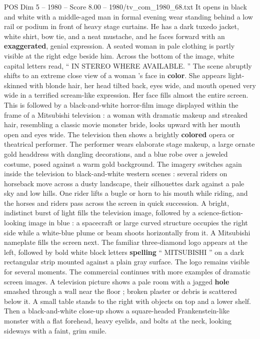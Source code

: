 \begin{textsample}{POS Dim 5 – 1980 – Score 8.00 – 1980/tv\_com\_1980\_68.txt}  \label{ex:f5_pos_032}
It opens in black and white with a middle-aged man in formal evening wear standing behind a low rail or podium in front of heavy stage curtains.
He has a dark tuxedo jacket, white shirt, bow tie, and a neat mustache, and he faces forward with an \textbf{exaggerated}, genial expression.
A seated woman in pale clothing is partly visible at the right edge beside him.
Across the bottom of the image, white capital letters read, “ IN STEREO WHERE AVAILABLE. ” The scene abruptly shifts to an extreme close view of a woman ’s face in \textbf{color}.
She appears light-skinned with blonde hair, her head tilted back, eyes wide, and mouth opened very wide in a terrified scream-like expression.
Her face fills almost the entire screen.
This is followed by a black-and-white horror-film image displayed within the frame of a Mitsubishi television : a woman with dramatic makeup and streaked hair, resembling a classic movie monster bride, looks upward with her mouth open and eyes wide.
The television then shows a brightly \textbf{colored} opera or theatrical performer.
The performer wears elaborate stage makeup, a large ornate gold headdress with dangling decorations, and a blue robe over a jeweled costume, posed against a warm gold background.
The imagery switches again inside the television to black-and-white western scenes : several riders on horseback move across a dusty landscape, their silhouettes dark against a pale sky and low hills.
One rider lifts a bugle or horn to his mouth while riding, and the horses and riders pass across the screen in quick succession.
A bright, indistinct burst of light fills the television image, followed by a science-fiction-looking image in blue : a spacecraft or large curved structure occupies the right side while a white-blue plume or beam shoots horizontally from it.
A Mitsubishi nameplate fills the screen next.
The familiar three-diamond logo appears at the left, followed by bold white block letters \textbf{spelling} “ MITSUBISHI ” on a dark rectangular strip mounted against a plain gray surface.
The logo remains visible for several moments.
The commercial continues with more examples of dramatic screen images.
A television picture shows a pale room with a jagged \textbf{hole} smashed through a wall near the floor ; broken plaster or debris is scattered below it.
A small table stands to the right with objects on top and a lower shelf.
Then a black-and-white close-up shows a square-headed Frankenstein-like monster with a flat forehead, heavy eyelids, and bolts at the neck, looking sideways with a faint, grim smile.

\end{textsample}
